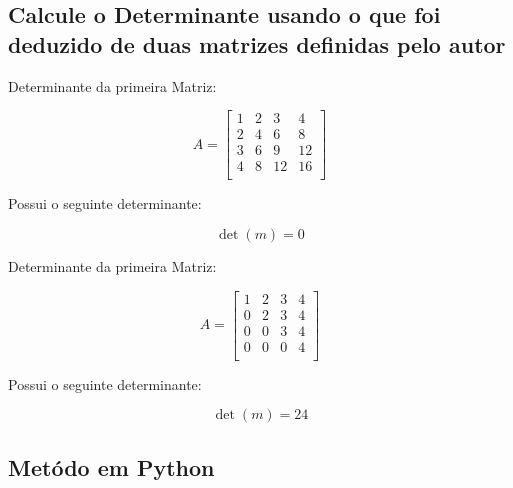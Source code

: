 \newpage

\begin{center}
\section{\Large Calcule o Determinante usando o que foi deduzido de duas matrizes definidas pelo autor}
\end{center}

\hspace{1.5cm}
Determinante da primeira Matriz:

\[
A = \begin{bmatrix}
1 & 2 & 3 & 4 \\
2 & 4 & 6 & 8 \\
3 & 6 & 9 & 12 \\
4 & 8 & 12 & 16 \\
\end{bmatrix}
\]

Possui o seguinte determinante:

\begin{Large}  
\[
\det(m) = 0
\]
\end{Large}

\vspace{1cm}

\hspace{1.5cm}
Determinante da primeira Matriz:

\[
A = \begin{bmatrix}
1 & 2 & 3 & 4 \\
0 & 2 & 3 & 4 \\
0 & 0 & 3 & 4 \\
0 & 0 & 0 & 4 \\
\end{bmatrix}
\]

Possui o seguinte determinante:

\begin{Large}  
\[
\det(m) = 24
\]
\end{Large}

\newpage

\begin{center}
\section{\Large Metódo em Python}
\end{center}

